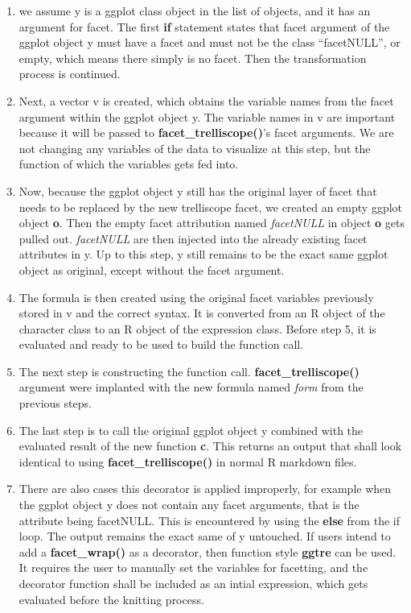 \documentclass[
]{article}
\begin{document}
\begin{enumerate}
\def\labelenumi{\arabic{enumi}.}
\item
  we assume y is a ggplot class object in the list of objects, and it
  has an argument for facet. The first \textbf{if} statement states that
  facet argument of the ggplot object y must have a facet and must not
  be the class ``facetNULL'', or empty, which means there simply is no
  facet. Then the transformation process is continued.
\item
  Next, a vector v is created, which obtains the variable names from the
  facet argument within the ggplot object y. The variable names in v are
  important because it will be passed to \textbf{facet\_trelliscope()}'s
  facet arguments. We are not changing any variables of the data to
  visualize at this step, but the function of which the variables gets
  fed into.
\item
  Now, because the ggplot object y still has the original layer of facet
  that needs to be replaced by the new trelliscope facet, we created an
  empty ggplot object \textbf{o}. Then the empty facet attribution named
  \emph{facetNULL} in object \textbf{o} gets pulled out.
  \emph{facetNULL} are then injected into the already existing facet
  attributes in y. Up to this step, y still remains to be the exact same
  ggplot object as original, except without the facet argument.
\item
  The formula is then created using the original facet variables
  previously stored in v and the correct syntax. It is converted from an
  R object of the character class to an R object of the expression
  class. Before step 5, it is evaluated and ready to be used to build
  the function call.
\item
  The next step is constructing the function call.
  \textbf{facet\_trelliscope()} argument were implanted with the new
  formula named \emph{form} from the previous steps.
\item
  The last step is to call the original ggplot object y combined with
  the evaluated result of the new function \textbf{c}. This returns an
  output that shall look identical to using
  \textbf{facet\_trelliscope()} in normal R markdown files.
\item
  There are also cases this decorator is applied improperly, for example
  when the ggplot object y does not contain any facet arguments, that is
  the attribute being facetNULL. This is encountered by using the
  \textbf{else} from the if loop. The output remains the exact same of y
  untouched. If users intend to add a \textbf{facet\_wrap()} as a
  decorator, then function style \textbf{ggtre} can be used. It requires
  the user to manually set the variables for facetting, and the
  decorator function shall be included as an intial expression, which
  gets evaluated before the knitting process.
\end{enumerate}
\end{document}
